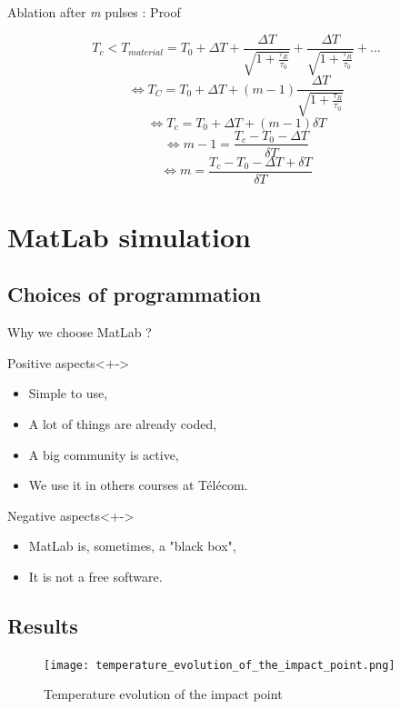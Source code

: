 \documentclass[11pt]{beamer}
\begin{document}
\begin{frame}{Ablation after \emph{m} pulses : Proof}

$$
T_c < T_{material} = T_0 + \Delta T + \frac{\Delta T}{\sqrt{1+\frac{\tau_R}{\tau_0}}} + \frac{\Delta T}{\sqrt{1+\frac{\tau_R}{\tau_0}}} + ...
$$
$$
\Leftrightarrow T_C = T_0 + \Delta T + (m-1) \frac{\Delta T}{\sqrt{1+\frac{\tau_R}{\tau_0}}}
$$
$$
\Leftrightarrow T_c = T_0 + \Delta T + (m-1) \delta T
$$
$$
\Leftrightarrow m-1 = \frac{T_c - T_0 - \Delta T}{\delta T}
$$
$$
\Leftrightarrow \boxed{m = \frac{T_c - T_0 - \Delta T + \delta T}{\delta T}}
$$


\end{frame}


\section{MatLab simulation}

\subsection{Choices of programmation}
\begin{frame}{Why we choose MatLab ?}
\begin{block}{Positive aspects}<+->
\begin{itemize}
\item<+-> Simple to use,
\item<+-> A lot of things are already coded,
\item<+-> A big community is active,
\item<+-> We use it in others courses at Télécom.
\end{itemize}
\end{block}

\begin{block}{Negative aspects}<+->
\begin{itemize}
\item<+-> MatLab is, sometimes, a "black box",
\item<+-> It is not a free software.
\end{itemize}
\end{block}
\end{frame}


\subsection{Results}
\begin{frame}


\begin{figure}[H]
\centering
\texttt{[image: temperature\_evolution\_of\_the\_impact\_point.png]}
\caption{Temperature evolution of the impact point}
\end{figure}

\end{frame}
\end{document}
